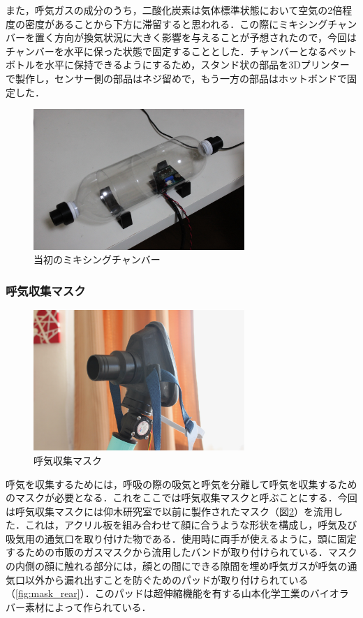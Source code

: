 また，呼気ガスの成分のうち，二酸化炭素は気体標準状態において空気の2倍程度の密度があることから下方に滞留すると思われる．この際にミキシングチャンバーを置く方向が換気状況に大きく影響を与えることが予想されたので，今回はチャンバーを水平に保った状態で固定することとした．チャンバーとなるペットボトルを水平に保持できるようにするため，スタンド状の部品を3Dプリンターで製作し，センサー側の部品はネジ留めで，もう一方の部品はホットボンドで固定した．

\begin{figure}[H]
  \begin{center}
    \includegraphics[width=8cm]{fig/mixing_chamber_early}
    \caption{当初のミキシングチャンバー}
    \label{fig:mixing_chamber_early}
  \end{center}
\end{figure}

\subsubsection{呼気収集マスク}

\begin{figure}[H]
  \begin{center}
    \includegraphics[width=8cm]{fig/mask_front}
    \caption{呼気収集マスク}
    \label{fig:mask_front}
  \end{center}
\end{figure}

呼気を収集するためには，呼吸の際の吸気と呼気を分離して呼気を収集するためのマスクが必要となる．これをここでは呼気収集マスクと呼ぶことにする．今回は呼気収集マスクには仰木研究室で以前に製作された\cite{mask_build}マスク（図\ref{fig:mask_front}）を流用した．これは，アクリル板を組み合わせて顔に合うような形状を構成し，呼気及び吸気用の通気口を取り付けた物である．使用時に両手が使えるように，頭に固定するための市販のガスマスクから流用したバンドが取り付けられている．マスクの内側の顔に触れる部分には，顔との間にできる隙間を埋め呼気ガスが呼気の通気口以外から漏れ出すことを防ぐためのパッドが取り付けられている（\ref{fig:mask_rear}）．このパッドは超伸縮機能を有する山本化学工業のバイオラバー素材によって作られている．

